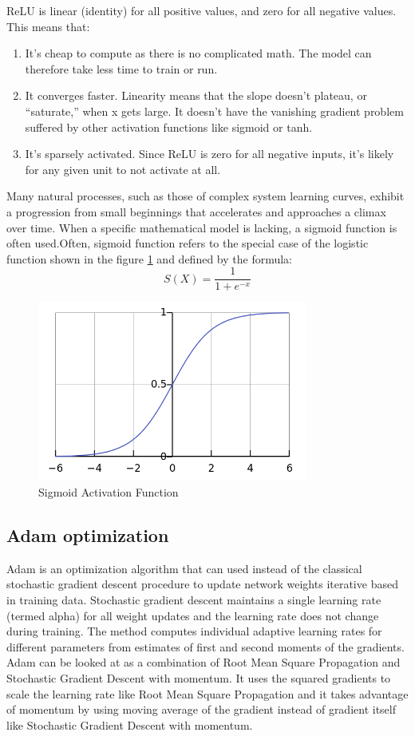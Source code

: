 \ac{ReLU} is linear (identity) for all positive values, and zero for all negative values. This means that:

\begin{enumerate}
		\item It’s cheap to compute as there is no complicated math. The model can therefore take less time to train or run.
		\item It converges faster. Linearity means that the slope doesn’t plateau, or “saturate,” when x gets large. It doesn’t have the vanishing gradient problem suffered by other activation functions like sigmoid or tanh.
		\item It’s sparsely activated. Since ReLU is zero for all negative inputs, it’s likely for any given unit to not activate at all.
\end{enumerate}
	
	Many natural processes, such as those of complex system learning curves, exhibit a progression from small beginnings that accelerates and approaches a climax over time. When a specific mathematical model is lacking, a sigmoid function is often used.Often, sigmoid function refers to the special case of the logistic function shown in the figure \ref{sigmoid} and defined by the formula:	
	\[S(X) = \frac{1}{1+e^{-x}}	\]

	\begin{figure}[tbh]
	\begin{center}
		\includegraphics[width = 3.5in]{images/sigmoid.png}
		\caption{Sigmoid Activation Function}
		\label{sigmoid}
	\end{center}
	\end{figure}
	
\subsection{Adam optimization}
Adam is an optimization algorithm that can used instead of the classical stochastic gradient descent procedure to update network weights iterative based in training data. Stochastic gradient descent maintains a single learning rate (termed alpha) for all weight updates and the learning rate does not change during training. The method computes individual adaptive learning rates for different parameters from estimates of first and second moments of the gradients.
Adam can be looked at as a combination of Root Mean Square Propagation and Stochastic Gradient Descent with momentum. It uses the squared gradients to scale the learning rate like Root Mean Square Propagation and it takes advantage of momentum by using moving average of the gradient instead of gradient itself like Stochastic Gradient Descent with momentum.

